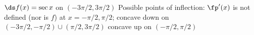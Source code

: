 {$\ds f(x) = \sec x $ on $(-3\pi/2,3\pi/2)$
}
{Possible points of inflection: $\fp'(x)$ is not defined (nor is $f$) at $x=-\pi/2,\pi/2$;
concave down on $(-3\pi/2,-\pi/2)\cup(\pi/2,3\pi/2)$
concave up on $(-\pi/2,\pi/2)$
}
